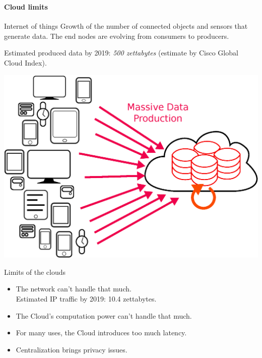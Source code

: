 \documentclass[utf8,xcolor=table, page number]{earlywinter}
\begin{document}
\begin{frame}
	\frametitle{\secname}
  \framesubtitle{Cloud limits}
  \begin{minipage}[l]{0.6\linewidth}
  \begin{block}{Internet of things}
    Growth of the number of connected objects and sensors that generate data.
    The end nodes are evolving from consumers to producers.
    
    Estimated produced data by 2019: \emph{500 zettabytes} {\tiny (estimate by Cisco Global Cloud Index)}.
  \end{block}
  \end{minipage}
  \begin{minipage}[l]{0.3\linewidth}
    \includegraphics[width=1.5\linewidth]{cloudlimits.eps}
  \end{minipage}
	\begin{alertblock}{Limits of the clouds}
          \begin{itemize}
            \item The network can't handle that much.\\
              Estimated IP traffic by 2019: 10.4 zettabytes.
            \item The Cloud's computation power can't handle that much.
            \item For many uses, the Cloud introduces too much latency.
            \item Centralization brings privacy issues.
          \end{itemize}
	\end{alertblock}
\end{frame}
\end{document}
